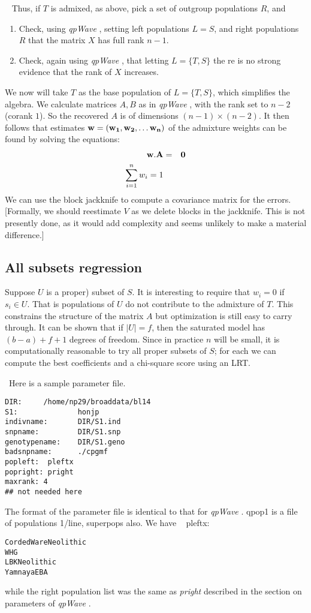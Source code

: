 \documentclass{article} %
\newcommand  {\nld }  {{\ \newline \noindent}}
\newcommand  {\qpw }  {{\em qpWave }}
\begin{document}
\nld
Thus, if $T$ is admixed, as above, pick a set of outgroup populations $R$, and 
\begin{enumerate} 
\item
Check, using \qpw, setting left populations $L=S$, and right populations $R$ that 
the matrix $X$ has full rank $n-1$.  
\item
Check, again using \qpw, that letting $L = \{T, S\}$ the re is no strong evidence that 
the rank of $X$ increases.
\end{enumerate}
We now will take $T$ as the base population of $L = \{T, S\}$, which simplifies the algebra.  
We calculate matrices $A, B$ as in \qpw, with the rank set to $n-2$ (corank $1$).   
So the recovered $A$ is of dimensions $ (n-1) \times (n-2)$.    
It then follows that 
estimates $\bf w = (w_1, w_2, \ldots w_n)$ of the admixture weights can be found by solving 
the equations: 
\begin{eqnarray*}
\bf w. A & =  & \bf 0  \\
\sum_{i=1}^n w_i = 1 
\end{eqnarray*}
We can use the block jackknife to compute a covariance matrix for the errors.  
[Formally, we should reestimate $V$ as we delete blocks in the jackknife.  
This is not
presently done, as it would add complexity and seems unlikely to make a material difference.]
\subsection{All subsets regression}
Suppose $U$ is a proper) subset of $S$.  It is interesting to require that $w_i = 0$ if $s_i \in U$.  
That is populations of $U$ do not contribute to the admixture of $T$.  This constrains the 
structure of the matrix $A$ but optimization is still easy to carry through.   
It can be shown that if $|U| = f$, then the saturated model has $ (b-a) + f + 1$  degrees of freedom.  
Since in practice $n$ will be small, it is computationally reasonable to 
try all proper  subsets of $S$;  for each we can compute the best coefficients and a chi-square score
using an LRT.

\
Here is a sample parameter file.  
\begin{verbatim} 
DIR:     /home/np29/broaddata/bl14
S1:              honjp    
indivname:       DIR/S1.ind  
snpname:         DIR/S1.snp       
genotypename:    DIR/S1.geno   
badsnpname:      ./cpgmf
popleft:  pleftx   
popright: pright 
maxrank: 4 
## not needed here
\end{verbatim} 
The format of the parameter file is identical to that for \qpw. 
qpop1 is a file of populations 1/line, superpops also.  We have 
\nld
pleftx: 
\begin{verbatim} 
CordedWareNeolithic
WHG
LBKNeolithic
YamnayaEBA
\end{verbatim}
while the right population list was the same as {\em pright} 
described in the section on parameters of \qpw. 
\end{document}
